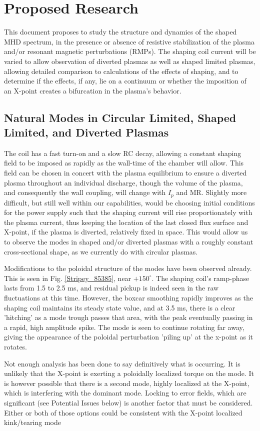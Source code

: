 \documentclass[aps,prl,twocolumn,superscriptaddress,groupedaddress]{revtex4}  %
\begin{document}
\section{Proposed Research}
	This document proposes to study the structure and dynamics of the shaped MHD spectrum, in the presence or absence of resistive stabilization of the plasma and/or resonant magnetic perturbations (RMPs).  The shaping coil current will be varied to allow observation of diverted plasmas as well as shaped limited plasmas, allowing detailed comparison to calculations of the effects of shaping, and to determine if the effects, if any, lie on a continuum or whether the imposition of an X-point creates a bifurcation in the plasma's behavior.\par 
	\subsection{Natural Modes in Circular Limited, Shaped Limited, and Diverted Plasmas}		
	The coil has a fast turn-on and a slow RC decay, allowing a constant shaping field to be imposed as rapidly as the wall-time of the chamber will allow.  This field can be chosen in concert with the plasma equilibrium to ensure a diverted plasma throughout an individual discharge, though the volume of the plasma, and consequently the wall coupling, will change with $I_p$ and MR.  Slightly more difficult, but still well within our capabilities, would be choosing initial conditions for the power supply such that the shaping current will rise proportionately with the plasma current, thus keeping the location of the last closed flux surface and X-point, if the plasma is diverted, relatively fixed in space.  This would allow us to observe the modes in shaped and/or diverted plasmas with a roughly constant cross-sectional shape, as we currently do with circular plasmas.\par
	Modifications to the poloidal structure of the modes have been observed already.  This is seen in Fig. \ref{Stripey_85385}, near $+150^{\circ}$.  The shaping coil's ramp-phase lasts from 1.5 to 2.5 ms, and residual pickup is indeed seen in the raw fluctuations at this time.  However, the boxcar smoothing rapidly improves as the shaping coil maintains its steady state value, and at 3.5 ms, there is a clear 'hitching' as a mode trough passes that area, with the peak eventually passing in a rapid, high amplitude spike.  The mode is seen to continue rotating far away, giving the appearance of the poloidal perturbation 'piling up' at the x-point as it rotates.\par
	Not enough analysis has been done to say definitively what is occurring.  It is unlikely that the X-point is exerting a poloidally localized torque on the mode.  It is however possible that there is a second mode, highly localized at the X-point, which is interfering with the dominant mode.  Locking to error fields, which are significant (see Potential Issues below) is another factor that must be considered.  Either or both of those options could be consistent with the X-point localized kink/tearing mode\cite{Huysmans}
\end{document}
